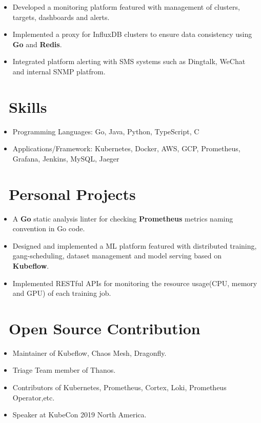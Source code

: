 \documentclass{resume}
\begin{document}
\begin{itemize}
  \item Developed a monitoring platform featured with management of clusters, targets, dashboards and alerts.
  \item Implemented a proxy for InfluxDB clusters to ensure data consistency using \textbf{Go} and \textbf{Redis}.
  \item Integrated platform alerting with SMS systems such as Dingtalk, WeChat and internal SNMP platfrom.
\end{itemize}

\section{\faKey\ Skills}
\begin{itemize}[parsep=0.5ex]
  \item Programming Languages: Go, Java, Python, TypeScript, C
  \item Applications/Framework: Kubernetes, Docker, AWS, GCP, Prometheus, Grafana, Jenkins, MySQL, Jaeger
\end{itemize}

\section{\faCogs\ Personal Projects}
\begin{itemize}
  \item A \textbf{Go} static analysis linter for checking \textbf{Prometheus} metrics naming convention in Go code.
\end{itemize}

\begin{itemize}
  \item Designed and implemented a ML platform featured with distributed training, gang-scheduling, dataset management and model serving based on \textbf{Kubeflow}.
  \item Implemented RESTful APIs for monitoring the resource usage(CPU, memory and GPU) of each training job.
\end{itemize}

\section{\faInfo\ Open Source Contribution}
\begin{itemize}[parsep=0.5ex]
  \item Maintainer of Kubeflow, Chaos Mesh, Dragonfly.
  \item Triage Team member of Thanos.
  \item Contributors of Kubernetes, Prometheus, Cortex, Loki, Prometheus Operator,etc.
  \item Speaker at KubeCon 2019 North America.
\end{itemize}
\end{document}
